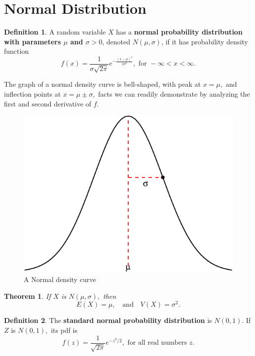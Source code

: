 \documentclass[
]{book}
\newtheorem{theorem}{Theorem}[chapter]
\theoremstyle{definition}
\newtheorem{definition}{Definition}[chapter]
\theoremstyle{definition}
\theoremstyle{definition}
\theoremstyle{definition}
\theoremstyle{remark}
\begin{document}
\section{Normal Distribution}\label{normal}

\begin{definition}
\protect\hypertarget{def:normal-distribution}{}\label{def:normal-distribution}A random variable \(X\) has a \textbf{normal probability distribution with parameters \(\mu\) and \(\sigma > 0\)}, denoted \(N(\mu,\sigma)\), if it has probability density function
\[
f(x)=\frac{1}{\sigma\sqrt{2\pi}}e^{-\frac{(x-\mu)^2}{2\sigma^2}}, \text{ for } -\infty < x < \infty.
\]
\end{definition}

The graph of a normal density curve is bell-shaped, with peak at \(x = \mu,\) and inflection points at \(x = \mu \pm \sigma,\) facts we can readily demonstrate by analyzing the first and second derivative of \(f\).

\begin{figure}
\centering
\includegraphics{math340-notes_files/figure-latex/bell-curve-1.pdf}
\caption{\label{fig:bell-curve}A Normal density curve}
\end{figure}

\begin{theorem}
\protect\hypertarget{thm:normal-EandV}{}\label{thm:normal-EandV}If \(X\) is \(N(\mu,\sigma),\) then \[E(X) = \mu, ~~~ \text{ and } ~~~ V(X) = \sigma^2.\]
\end{theorem}

\begin{definition}
\protect\hypertarget{def:standard-normal}{}\label{def:standard-normal}The \textbf{standard normal probability distribution} is \(N(0,1)\). If \(Z\) is \(N(0,1),\) its pdf is \[f(z) = \frac{1}{\sqrt{2\pi}}e^{-z^2/2}, \text{ for all real numbers } z.\]
\end{definition}
\end{document}
